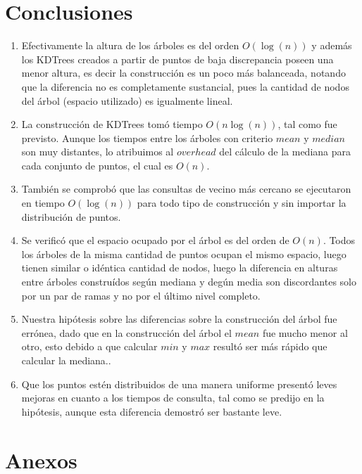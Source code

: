\documentclass[12pt,letterpaper, margin = 3cm]{article}
\begin{document}
\section{Conclusiones}
\begin{enumerate} 
\item Efectivamente la altura de los árboles es del orden $O(\log(n))$ y además los KDTrees creados a partir de puntos de baja discrepancia poseen una menor altura, es decir la construcción es un poco más balanceada, notando que la diferencia no es completamente sustancial, pues la cantidad de nodos del árbol (espacio utilizado) es igualmente lineal.
\item La construcción de KDTrees tomó tiempo $O(n\log(n))$, tal como fue previsto. Aunque los tiempos entre los árboles con criterio $mean$ y $median$ son muy distantes, lo atribuimos al $overhead$ del cálculo de la mediana para cada conjunto de puntos, el cual es $O(n)$.
\item También se comprobó que las consultas de vecino más cercano se ejecutaron en tiempo $O(\log(n))$ para todo tipo de construcción y sin importar la distribución de puntos.
\item Se verificó que el espacio ocupado por el árbol es del orden de $O(n)$. Todos los árboles de la misma cantidad de puntos ocupan el mismo espacio, luego tienen similar o idéntica cantidad de nodos, luego la diferencia en alturas entre árboles construídos según mediana y degún media son discordantes solo por un par de ramas y no por el último nivel completo.
\item Nuestra hipótesis sobre las diferencias sobre la construcción del árbol fue errónea, dado que en la construcción del árbol el $mean$ fue mucho menor al otro, esto debido a que calcular $min$ y $max$ resultó ser más rápido que calcular la mediana..
\item Que los puntos estén distribuidos de una manera uniforme presentó leves mejoras en cuanto a los tiempos de consulta, tal como se predijo en la hipótesis, aunque esta diferencia demostró ser bastante leve.
\end{enumerate}




\newpage
\section{Anexos}
\end{document}
